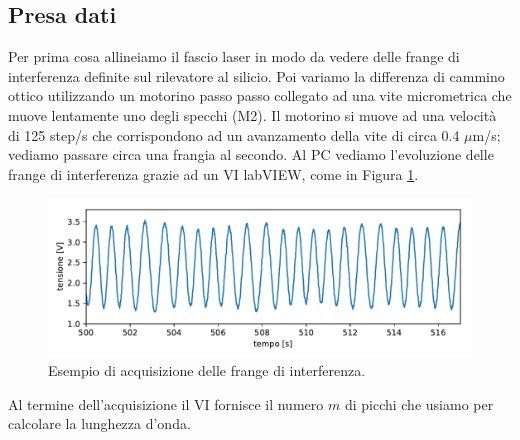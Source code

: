 \documentclass[a4paper]{article}
\begin{document}
\subsection{Presa dati}
Per prima cosa allineiamo il fascio laser in modo da vedere delle frange di interferenza definite sul rilevatore al silicio. 
Poi variamo la differenza di cammino ottico utilizzando un motorino passo passo collegato ad una vite micrometrica che muove lentamente uno degli specchi (M2). Il motorino si muove ad una velocità di 125 step/s che corrispondono ad un avanzamento della vite di circa 0.4 $\mu$m/s; vediamo passare circa una frangia al secondo.
Al PC vediamo l'evoluzione delle frange di interferenza grazie ad un VI labVIEW, come in Figura \ref{fig:esempio_acquisizione_frange}.
\begin{figure}[H]
	\includegraphics[width=1\textwidth]{esempio_acquisizione_frange.pdf}
	\caption{Esempio di acquisizione delle frange di interferenza.}
	\label{fig:esempio_acquisizione_frange}
\end{figure}
Al termine dell'acquisizione il VI fornisce il numero $m$ di picchi che usiamo per calcolare la lunghezza d'onda.
\end{document}
